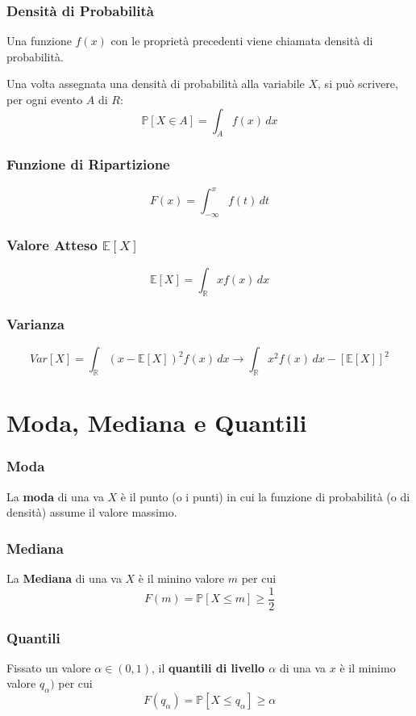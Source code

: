 \newpage
\subsubsection{Densità di Probabilità}
Una funzione \(f(x)\) con le proprietà precedenti viene chiamata densità di probabilità.

Una volta assegnata una densità di probabilità alla variabile \(X\), si può scrivere, per ogni evento \(A\) di \(R\): 
\[\mathbb{P}[X \in A] = \int_{A}f(x)\,dx\]

\subsubsection{Funzione di Ripartizione}
\[F(x) = \int_{-\infty}^x f(t)\,dt\]

\subsubsection{Valore Atteso \(\mathbb{E}[X]\)}
\[\mathbb{E}[X] = \int_{\mathbb{R}}xf(x)\,dx\]

\subsubsection{Varianza}
\[Var[X] = \int_{\mathbb{R}}(x - \mathbb{E}[X])^2f(x)\,dx \rightarrow \int_{\mathbb{R}}x^2f(x)\,dx - [\mathbb{E}[X]]^2\]

\section{Moda, Mediana e Quantili}
\subsubsection{Moda}
La \textbf{moda} di una va \(X\) è il punto (o i punti) in cui la funzione di probabilità (o di densità) assume il valore massimo.

\subsubsection{Mediana}
La \textbf{Mediana} di una va \(X\) è il minino valore \(m\) per cui
\[F(m) = \mathbb{P}[X \leq m] \geq \frac{1}{2}\]

\subsubsection{Quantili}
Fissato un valore \(\alpha \in (0,1)\), il \textbf{quantili di livello \(\alpha\)} di una va \(x\) è il minimo valore \(q_{\alpha})\) per cui
\[F(q_{\alpha}) = \mathbb{P}[X \leq q_{\alpha}] \geq \alpha\]